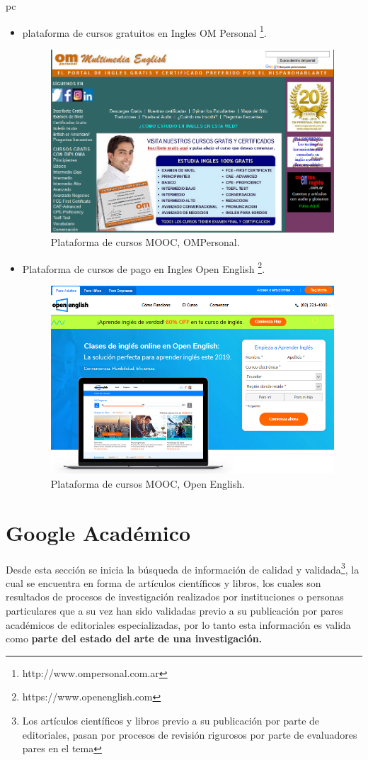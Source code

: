 pc\documentclass[a4paper,12pt,openany]{book}
\begin{document}
\begin{itemize}
\begin{itemize}
\item plataforma de cursos gratuitos en Ingles OM Personal \footnote{http://www.ompersonal.com.ar}.\

\begin{figure}[H]
  \centering
	\includegraphics[width=11cm]{OmPersonal.png}
\caption{Plataforma de cursos MOOC, OMPersonal.}
  \label{fig:OMP}
\end{figure}

\item Plataforma de cursos de pago en Ingles Open English \footnote{https://www.openenglish.com}.\

\begin{figure}[H]
  \centering
	\includegraphics[width=11cm]{Open-English.png}
\caption{Plataforma de cursos MOOC, Open English.}
  \label{fig:Open}
\end{figure}

\end{itemize}

\clearpage
\chapter{Google Académico}
Desde esta sección se inicia la búsqueda de información de calidad y validada\footnote{Los artículos científicos y libros previo a su publicación por parte de editoriales, pasan por procesos de revisión rigurosos por parte de evaluadores pares en el tema}, la cual se encuentra en forma de artículos científicos y libros, los cuales son resultados de procesos de investigación realizados por instituciones o personas particulares que a su vez han sido validadas previo a su publicación por pares académicos de editoriales especializadas, por lo tanto esta información es valida como \textbf{parte del estado del arte de una investigación.}


\end{itemize}
\end{document}
